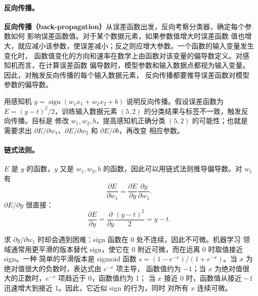 \paragraph{反向传播。}
\textbf{反向传播（back-propagation）}从误差函数出发，反向考察分类器，确定每个参数如何
影响误差函数值\cite{appb-lecun-handwritten}。对于某个数据元素，如果参数值增大时误差函数
值也增大，就应减小该参数，使误差减小；反之则应增大参数。一个函数的输入变量发生变化时，
函数值变化的方向和速率在数学上由函数对该变量的偏导数定义。对感知机而言，在计算误差函数
偏导数时，模型参数和输入数据点都视为输入变量。因此，对触发反向传播的每个输入数据元素，
反向传播都要推导误差函数对模型参数的偏导数。

用感知机 $y=\operatorname{sign}(w_1x_1+w_2x_2+b)$ 说明反向传播。假设误差函数为
$E=(y-t)^2/2$，训练输入数据元素 $(5,2)$ 的分类结果与标签不一致，触发反向传播。目标是
修改 $w_1,w_2,b$，提高感知机正确分类 $(5,2)$ 的可能性；也就是需要求出
$\partial E/\partial w_1$、$\partial E/\partial w_2$ 和 $\partial E/\partial b$，再改变
相应参数。

\paragraph{链式法则。}
$E$ 是 $y$ 的函数，$y$ 又是 $w_1,w_2,b$ 的函数，因此可以用链式法则推导偏导数。对
$w_1$ 有
\begin{equation}
  \frac{\partial E}{\partial w_1}=\frac{\partial E}{\partial y}
    \frac{\partial y}{\partial w_1}.
  \label{eq:appb-7}
\end{equation}
$\partial E/\partial y$ 很直接：
\begin{equation}
  \frac{\partial E}{\partial y}=\frac{\partial}{\partial y}
    \frac{(y-t)^2}{2}=y-t.
  \label{eq:appb-8}
\end{equation}

求 $\partial y/\partial w_1$ 时却会遇到困难：sign 函数在 0 处不连续，因此不可微。机器学习
领域通常用更平滑的版本替代 sign，使它在 0 附近可微，而在远离 0 时取值接近 sign。一种
简单的平滑版本是 sigmoid 函数
$s=(1-e^{-x})/(1+e^{-x})$。当 $x$ 为绝对值很大的负数时，表达式由 $e^{-x}$ 项主导，
函数值约为 $-1$；当 $x$ 为绝对值很大的正数时，$e^{-x}$ 项趋近于 0，函数值约为 1；
当 $x$ 接近 0 时，函数值从接近 $-1$ 迅速增大到接近 1。因此，它近似 sign 的行为，同时
对所有 $x$ 连续可微。


